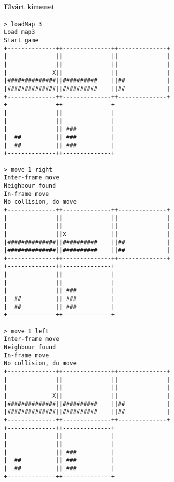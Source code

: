 		        \paragraph*{Elvárt kimenet}
\begin{verbatim}
> loadMap 3
Load map3
Start game
+--------------++--------------++--------------+
|              ||              ||              |
|              ||              ||              |
|             X||              ||              |
|##############||##########    ||##            |
|##############||##########    ||##            |
+--------------++--------------++--------------+
+--------------++--------------+                
|              ||              |                
|              ||              |                
|              || ###          |                
|  ##          || ###          |                
|  ##          || ###          |                
+--------------++--------------+                

> move 1 right
Inter-frame move
Neighbour found
In-frame move
No collision, do move
+--------------++--------------++--------------+
|              ||              ||              |
|              ||              ||              |
|              ||X             ||              |
|##############||##########    ||##            |
|##############||##########    ||##            |
+--------------++--------------++--------------+
+--------------++--------------+                
|              ||              |                
|              ||              |                
|              || ###          |                
|  ##          || ###          |                
|  ##          || ###          |                
+--------------++--------------+                

> move 1 left
Inter-frame move
Neighbour found
In-frame move
No collision, do move
+--------------++--------------++--------------+
|              ||              ||              |
|              ||              ||              |
|             X||              ||              |
|##############||##########    ||##            |
|##############||##########    ||##            |
+--------------++--------------++--------------+
+--------------++--------------+                
|              ||              |                
|              ||              |                
|              || ###          |                
|  ##          || ###          |                
|  ##          || ###          |                
+--------------++--------------+                


\end{verbatim}

